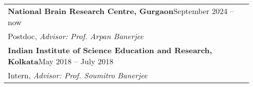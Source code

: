 

\noindent
\begin{tabular}{@{} m{18.5cm}}
\textbf{National Brain Research Centre, Gurgaon}\hfill September 2024 -- now\\
Postdoc, \textit{Advisor: Prof. Arpan Banerjee}\\[0.3cm]

\textbf{Indian Institute of Science Education and Research, Kolkata}\hfill May 2018 -- July 2018 \\
Intern, \textit{Advisor: Prof. Soumitro Banerjee}\\
\end{tabular}